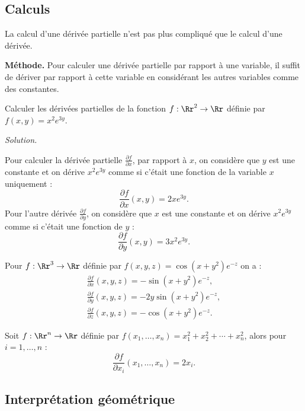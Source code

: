 \documentclass[11pt,class=report,crop=false]{standalone}
\begin{document}
\subsection{Calculs}

La calcul d'une dérivée partielle n'est pas plus compliqué que le calcul d'une dérivée.

\textbf{Méthode.}
Pour calculer une dérivée partielle par rapport à une variable, il suffit de dériver par rapport à cette variable en considérant les autres variables comme des constantes.


\begin{exemple}
Calculer les dérivées partielles de la fonction 
$f : \Rr^2 \to \Rr$ définie par $f(x,y)=x^2e^{3y}$.

\medskip
\emph{Solution.}

Pour calculer la dérivée partielle $\frac{\partial f}{\partial x}$, par rapport à $x$, on considère que $y$ est une constante et on dérive $x^2e ^{3y}$ comme si c'était une fonction de la variable $x$ uniquement :
$$\frac{\partial f}{\partial x}(x,y) =2xe ^{3y}.$$
Pour l'autre dérivée  $\frac{\partial f}{\partial y}$, on considère que $x$ est une constante et on dérive $x^2e ^{3y}$ comme si c'était une fonction de $y$ :
$$\frac{\partial f}{\partial y}(x,y) = 3x^2e ^{3y}.$$
\end{exemple}



\begin{exemple}
Pour $f : \Rr^3 \to \Rr$ définie par $f(x,y,z)=\cos (x+y^2)e^{-z}$ on a :
\begin{align*}
\frac{\partial f}{\partial x}(x,y,z) = -\sin(x+y^2)e^{-z}, \\
\frac{\partial f}{\partial y}(x,y,z) = -2y\sin(x+y^2)e^{-z}, \\
\frac{\partial f}{\partial z}(x,y,z) = -\cos(x+y^2)e^{-z}.
\end{align*}
\end{exemple}


\begin{exemple}
Soit $f :\Rr^n \to \Rr$ définie par 
$f(x_1,\ldots,x_n) = x_1^2+x_2^2+\cdots + x_n^2$,
alors pour $i=1,\ldots,n$ :
$$\frac{\partial f}{\partial x_i}(x_1,\ldots,x_n) = 2x_i.$$
\end{exemple}


\subsection{Interprétation géométrique}
\end{document}

